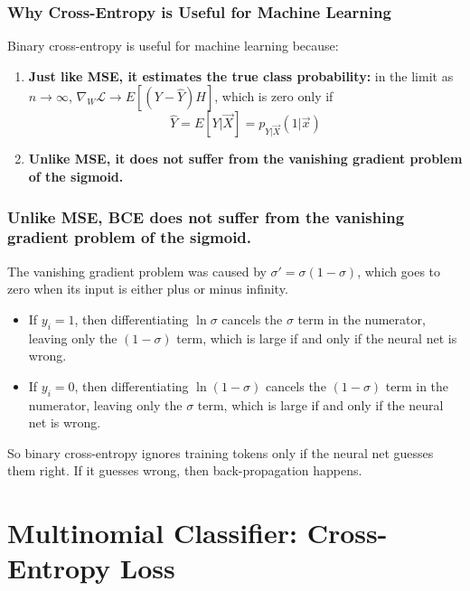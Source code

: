 \documentclass{beamer}
\begin{document}
\begin{frame}
  \frametitle{Why Cross-Entropy is Useful for Machine Learning}
  Binary cross-entropy is useful for machine learning  because:
  \begin{enumerate}
  \item {\bf Just like MSE, it estimates the true class probability:}
    in the limit as $n\rightarrow\infty$, $\nabla_W{\mathcal
      L}\rightarrow E\left[(Y-\hat{Y})H\right]$, which is zero
    only if
    \[
    \hat{Y}=E\left[Y|\vec{X}\right]=p_{Y|\vec{X}}(1|\vec{x})
    \]
  \item {\bf Unlike MSE, it does not suffer from the vanishing
    gradient problem of the sigmoid.}
  \end{enumerate}
\end{frame}
\begin{frame}
  \frametitle{Unlike MSE, BCE does not suffer from the vanishing
    gradient problem of the sigmoid.}
  The vanishing gradient problem
  was caused by
  $\sigma'=\sigma(1-\sigma)$, which
  goes to zero when its input is either plus or minus infinity.
  \begin{itemize}
  \item If $y_i=1$, then differentiating $\ln\sigma$
    cancels the $\sigma$ term in the numerator, leaving only the
    $(1-\sigma)$ term, which is large if and only if the neural net
    is wrong.
  \item If $y_i=0$, then differentiating $\ln(1-\sigma)$
    cancels the $(1-\sigma)$ term in the numerator, leaving only the
    $\sigma$ term, which is large if and only if the neural net is wrong.
  \end{itemize}
  So binary cross-entropy ignores training tokens only if the neural
  net guesses them right.  If it guesses wrong, then
  back-propagation happens.
\end{frame}

\section[CE Loss]{Multinomial Classifier: Cross-Entropy  Loss}
\setcounter{subsection}{1}
\end{document}
